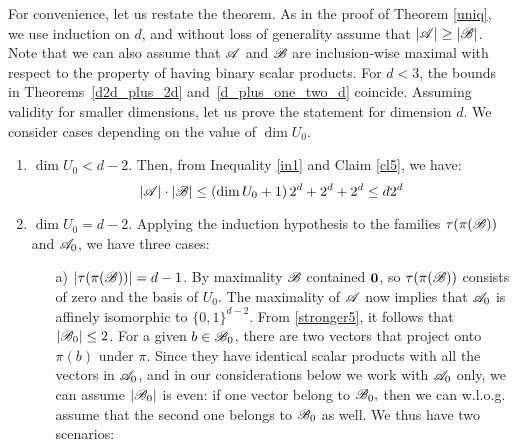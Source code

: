 For convenience, let us restate the theorem.
\mainth*
    As in the proof of Theorem \ref{uniq}, we  use induction on $d$, and without loss of generality assume that $\left|{\mathscr{A}}\right|\geq\left|{\mathscr{B}}\right|$. Note that we can also assume that ${\mathscr{A}}$ and ${\mathscr{B}}$ are inclusion-wise maximal with respect to the property of having binary scalar products. For $d<3$, the bounds in Theorems~\ref{d2d_plus_2d} and~\ref{d_plus_one_two_d} coincide. Assuming validity for smaller dimensions, let us prove the statement for dimension $d$. We consider cases depending on the  value of $\operatorname{dim}U_0$.

    \begin{enumerate}
        \item\label{caseVerySmallU0} $\operatorname{dim}U_0 < d-2$. Then, from Inequality \ref{in1} and Claim \ref{cl5}, we have:
        \begin{equation}\label{strongWhenLessd-2}
            \left|{\mathscr{A}}\right|\cdot\left|{\mathscr{B}}\right| \leq \left(\operatorname{dim} U_0 + 1\right) 2^d + 2^d + 2^d\leq d 2^d
        \end{equation}
        \item\label{caseSmallU0} $\operatorname{dim}U_0 = d-2$. Applying the induction hypothesis to the families $\tau(\pi({\mathscr{B}}))$ and ${\mathscr{A}}_0$, we have three cases:
        \begin{enumerate}
            \item[a)] $|\tau(\pi({\mathscr{B}}))|=d-1$. By maximality ${\mathscr{B}}$ contained $\mathbf{0}$, so $\tau(\pi({\mathscr{B}}))$ consists of zero and the basis of $U_0$. The maximality of ${\mathscr{A}}$ now implies that ${\mathscr{A}}_0$ is affinely isomorphic to $\{0,1\}^{d-2}$. From \eqref{stronger5}, it follows that $\left|{\mathscr{B}}_0\right|\leq2$. 
            For a given $b\in{\mathscr{B}}_0$, there are two vectors that project onto $\pi(b)$ under $\pi$. Since they have identical scalar products with all the vectors in ${\mathscr{A}}_0$, and in our considerations below we work with ${\mathscr{A}}_0$ only, we can assume $|{\mathscr{B}}_0|$ is even: if one vector belong to ${\mathscr{B}}_0,$ then we can w.l.o.g. assume that the second one belongs to ${\mathscr{B}}_0$ as well. We thus have two scenarios:

\end{enumerate}
\end{enumerate}
